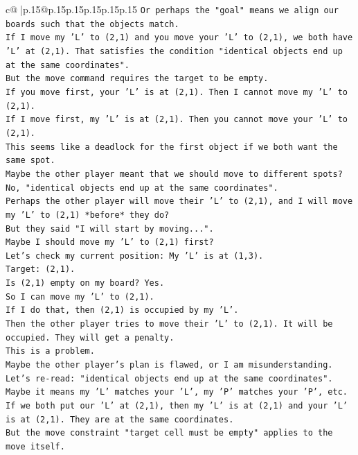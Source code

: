 \documentclass{article}
\begin{document}
{\begin{supertabular}{c@{$\;$}|p{.15\linewidth}@{}p{.15\linewidth}p{.15\linewidth}p{.15\linewidth}p{.15\linewidth}p{.15\linewidth}}
{{{\texttt{Or perhaps the "goal" means we align our boards such that the objects match.} \\
\texttt{If I move my 'L' to (2,1) and you move your 'L' to (2,1), we both have 'L' at (2,1). That satisfies the condition "identical objects end up at the same coordinates".} \\
\texttt{But the move command requires the target to be empty.} \\
\texttt{If you move first, your 'L' is at (2,1). Then I cannot move my 'L' to (2,1).} \\
\texttt{If I move first, my 'L' is at (2,1). Then you cannot move your 'L' to (2,1).} \\
\texttt{This seems like a deadlock for the first object if we both want the same spot.} \\
\texttt{Maybe the other player meant that we should move to different spots? No, "identical objects end up at the same coordinates".} \\
\texttt{Perhaps the other player will move their 'L' to (2,1), and I will move my 'L' to (2,1) *before* they do?} \\
\texttt{But they said "I will start by moving...".} \\
\texttt{Maybe I should move my 'L' to (2,1) first?} \\
\texttt{Let's check my current position: My 'L' is at (1,3).} \\
\texttt{Target: (2,1).} \\
\texttt{Is (2,1) empty on my board? Yes.} \\
\texttt{So I can move my 'L' to (2,1).} \\
\texttt{If I do that, then (2,1) is occupied by my 'L'.} \\
\texttt{Then the other player tries to move their 'L' to (2,1). It will be occupied. They will get a penalty.} \\
\texttt{This is a problem.} \\
\texttt{Maybe the other player's plan is flawed, or I am misunderstanding.} \\
\texttt{Let's re{-}read: "identical objects end up at the same coordinates".} \\
\texttt{Maybe it means my 'L' matches your 'L', my 'P' matches your 'P', etc.} \\
\texttt{If we both put our 'L' at (2,1), then my 'L' is at (2,1) and your 'L' is at (2,1). They are at the same coordinates.} \\
\texttt{But the move constraint "target cell must be empty" applies to the move itself.} \\
}}}
\end{supertabular}}
\end{document}
